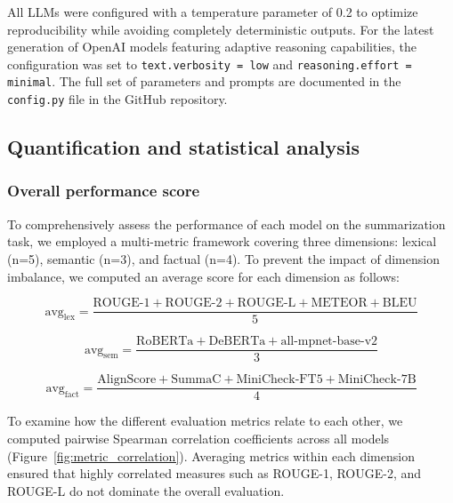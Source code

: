 All LLMs were configured with a temperature parameter of 0.2 to optimize reproducibility while avoiding completely deterministic outputs. For the latest generation of OpenAI models featuring adaptive reasoning capabilities, the configuration was set to \texttt{text.verbosity = low} and \texttt{reasoning.effort = minimal}. The full set of parameters and prompts are documented in the \texttt{config.py} file in the GitHub repository.

\subsection{Quantification and statistical analysis}

\subsubsection{Overall performance score}

To comprehensively assess the performance of each model on the summarization task, we employed a multi-metric framework covering three dimensions: lexical (n=5), semantic (n=3), and factual (n=4). To prevent the impact of dimension imbalance, we computed an average score for each dimension as follows: 

{\scriptsize
\begin{equation}
\mathrm{avg}_{\text{lex}} =
\frac{
\mathrm{ROUGE\text{-}1} + \mathrm{ROUGE\text{-}2} + \mathrm{ROUGE\text{-}L}+ \mathrm{METEOR} + \mathrm{BLEU}
}{5}
\end{equation}
}

{\scriptsize
\begin{equation}
\mathrm{avg}_{\text{sem}} =
\frac{
\mathrm{RoBERTa} + \mathrm{DeBERTa} + \mathrm{all\text{-}mpnet\text{-}base\text{-}v2}
}{3}
\end{equation}
}

{\scriptsize
\begin{equation}
\mathrm{avg}_{\text{fact}} =
\frac{
\mathrm{AlignScore} + \mathrm{SummaC} + \mathrm{MiniCheck\text{-}FT5} + \mathrm{MiniCheck\text{-}7B}
}{4}
\end{equation}
}

To examine how the different evaluation metrics relate to each other, we computed pairwise Spearman correlation coefficients across all models (Figure~\ref{fig:metric_correlation}). Averaging metrics within each dimension ensured that highly correlated measures such as ROUGE-1, ROUGE-2, and ROUGE-L do not dominate the overall evaluation. 

